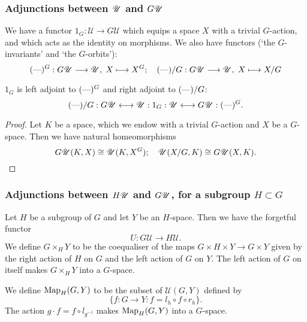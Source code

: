\documentclass[11pt]{article}
\begin{document}
\begin{FirstWeek}
\subsubsection*{Adjunctions between $\mathscr{U}$ and $G\mathscr{U}$}
We have a functor $1_G:\mathscr{U}\to G\mathscr{U}$ which equips a space $X$ with a trivial $G$-action, and which acts as the identity on morphisms.
We also have functors (`the $G$-invariants' and `the $G$-orbits'):
\[(\textup{---})^G:G\mathscr{U}\longrightarrow\mathscr{U}, \hspace{3pt} X\longmapsto X^G; \hspace{10pt}
(\textup{---})/G:G\mathscr{U}\longrightarrow\mathscr{U}, \hspace{3pt} X\longmapsto X/G\]
\begin{thm*} $1_G$ is left adjoint to $(\textup{---})^G$ and right adjoint to $(\textup{---})/G$:
\[(\textup{---})/G:G\mathscr{U}\longleftrightarrow\mathscr{U}: 1_G:\mathscr{U}\longleftrightarrow G\mathscr{U}: (\textup{---})^G.\]
\end{thm*}
\begin{proof}  Let $K$ be a space, which we endow with a trivial $G$-action and $X$ be a $G$-space. Then we have natural homeomorphisms
\[G\mathscr{U}(K,X)\cong\mathscr{U}(K,X^G);\hspace{10pt}
\mathscr{U}(X/G,K)\cong G\mathscr{U}(X,K).\qedhere\]
\end{proof}
\subsubsection*{Adjunctions between $H\mathscr{U}$ and $G\mathscr{U}$, for a subgroup $H\subset G$}
Let $H$ be a subgroup of $G$ and let $Y$ be an $H$-space. Then we have the forgetful functor
\[U:G\mathscr{U}\to H\mathscr{U}.\]
We define $G\times_H Y$ to be the coequaliser of the maps $G\times H\times Y\to G\times Y$ given by the right action of $H$ on $G$ and the left action of $G$ on $Y$. The left action of $G$ on itself makes $G\times_H Y$ into a $G$-space.

We define $\textup{Map}_H(G,Y)$ to be the subset of $\mathscr{U}(G,Y)$ defined by
\[\{f:G\to Y: f=l_h\circ f\circ r_h\}.\]
The action $g\cdot f=f\circ l_{g^{-1}}$ makes $\textup{Map}_H(G,Y)$ into a $G$-space.


\end{FirstWeek}
\end{document}
